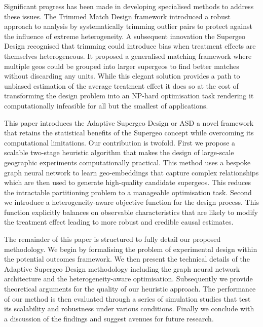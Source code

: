 \documentclass[final,3p,fleqn, 10pt]{elsarticle}
\begin{document}
Significant progress has been made in developing specialised methods to address these issues. The Trimmed Match Design framework introduced a robust approach to analysis by systematically trimming outlier pairs to protect against the influence of extreme heterogeneity. A subsequent innovation the Supergeo Design recognised that trimming could introduce bias when treatment effects are themselves heterogeneous. It proposed a generalised matching framework where multiple geos could be grouped into larger supergeos to find better matches without discarding any units. While this elegant solution provides a path to unbiased estimation of the average treatment effect it does so at the cost of transforming the design problem into an NP-hard optimisation task rendering it computationally infeasible for all but the smallest of applications.

This paper introduces the Adaptive Supergeo Design or ASD a novel framework that retains the statistical benefits of the Supergeo concept while overcoming its computational limitations. Our contribution is twofold. First we propose a scalable two-stage heuristic algorithm that makes the design of large-scale geographic experiments computationally practical. This method uses a bespoke graph neural network to learn geo-embeddings that capture complex relationships which are then used to generate high-quality candidate supergeos. This reduces the intractable partitioning problem to a manageable optimisation task. Second we introduce a heterogeneity-aware objective function for the design process. This function explicitly balances on observable characteristics that are likely to modify the treatment effect leading to more robust and credible causal estimates.

The remainder of this paper is structured to fully detail our proposed methodology. We begin by formalising the problem of experimental design within the potential outcomes framework. We then present the technical details of the Adaptive Supergeo Design methodology including the graph neural network architecture and the heterogeneity-aware optimisation. Subsequently we provide theoretical arguments for the quality of our heuristic approach. The performance of our method is then evaluated through a series of simulation studies that test its scalability and robustness under various conditions.  Finally we conclude with a discussion of the findings and suggest avenues for future research.
\end{document}

